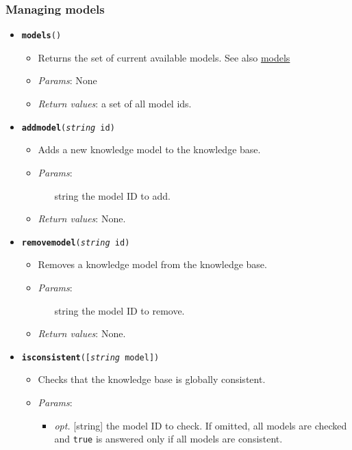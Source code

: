 \subsubsection{Managing models}


\begin{itemize}
\item  \texttt{\textbf{models}()}
\begin{itemize}
\item  Returns the set of current available models. See also \hyperref[ac5552fd6a3c08ad22387efbe42d137d]{models}
\item  \emph{Params}: None
\item  \emph{Return values}: a set of all model ids.
\end{itemize}

\item  \texttt{\textbf{addmodel}(\emph{string} id)}
\begin{itemize}
\item  Adds a new knowledge model to the knowledge base.
\item  \emph{Params}:
\begin{itemize}
\item  [string] the model ID to add.
\end{itemize}

\item  \emph{Return values}: None.
\end{itemize}

\item  \texttt{\textbf{removemodel}(\emph{string} id)}
\begin{itemize}
\item  Removes a knowledge model from the knowledge base.
\item  \emph{Params}:
\begin{itemize}
\item  [string] the model ID to remove.
\end{itemize}

\item  \emph{Return values}: None.
\end{itemize}

\item  \texttt{\textbf{isconsistent}([\emph{string} model])}
\begin{itemize}
\item  Checks that the knowledge base is globally consistent.
\item  \emph{Params}:
\begin{itemize}
\item  \emph{opt.} [string] the model ID to check. If omitted, all models are checked and \texttt{true} is answered only if all models are consistent. 
\end{itemize}


\end{itemize}
\end{itemize}

